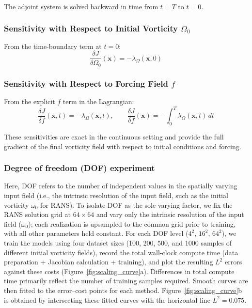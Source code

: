 The adjoint system is solved backward in time from $t = T$ to $t = 0$.

\subsubsection*{Sensitivity with Respect to Initial Vorticity $\Omega_0$}

From the time-boundary term at $t=0$:
\begin{equation}
\boxed{
\frac{\delta J}{\delta \Omega_0}(\mathbf{x})
= -\lambda_{\Omega}(\mathbf{x}, 0)
}
\end{equation}

\subsubsection*{Sensitivity with Respect to Forcing Field $f$}

From the explicit $f$ term in the Lagrangian:
\begin{equation}
\boxed{
\frac{\delta J}{\delta f}(\mathbf{x}, t)
= -\lambda_{\Omega}(\mathbf{x}, t),
\qquad
\frac{\delta J}{\delta f}(\mathbf{x})
= -\int_0^T \lambda_{\Omega}(\mathbf{x}, t) \, dt
}
\end{equation}

These sensitivities are exact in the continuous setting and provide the full gradient of the final vorticity field with respect to initial conditions and forcing.

\subsubsection*{Degree of freedom (DOF) experiment}
Here, DOF refers to the number of independent values in the spatially varying input field (i.e., the intrinsic resolution of the input field, such as the initial vorticity $\omega_0$ for RANS). To isolate DOF as the sole varying factor, we fix the RANS solution grid at $64\times64$ and vary only the intrinsic resolution of the input field ($\omega_0$); each realization is upsampled to the common grid prior to training, with all other parameters held constant. For each DOF level ($4^2$, $16^2$, $64^2$), we train the models using four dataset sizes (100, 200, 500, and 1000 samples of different initial vorticity fields), record the total wall-clock compute time (data preparation + Jacobian calculation + training), and plot the resulting $L^2$ errors against these costs (Figure~\ref{fig:scaling_curve}a). Differences in total compute time primarily reflect the number of training samples required. Smooth curves are then fitted to the error--cost points for each method. Figure~\ref{fig:scaling_curve}b is obtained by intersecting these fitted curves with the horizontal line $L^2 = 0.075$. %

